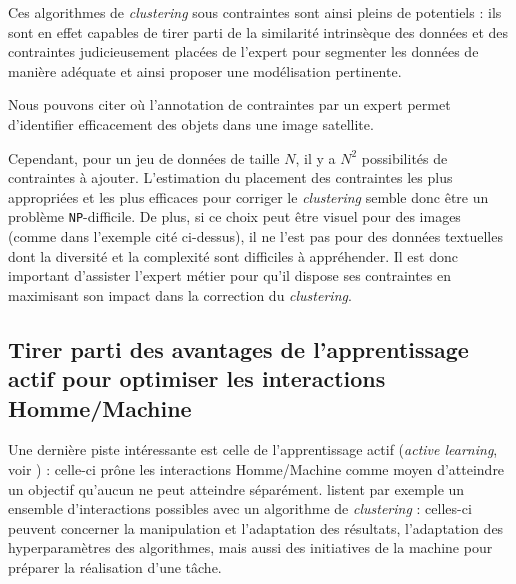 		Ces algorithmes de \textit{clustering} sous contraintes sont ainsi pleins de potentiels : ils sont en effet capables de tirer parti de la similarité intrinsèque des données et des contraintes judicieusement placées de l'expert pour segmenter les données de manière adéquate et ainsi proposer une modélisation pertinente.
		\begin{leftBarExamples}
			Nous pouvons citer \cite{lampert-etal:2019:constrained-distance-based} où l'annotation de contraintes par un expert permet d'identifier efficacement des objets dans une image satellite.
		\end{leftBarExamples}
		
		Cependant, pour un jeu de données de taille $N$, il y a $N^2$ possibilités de contraintes à ajouter.
		L'estimation du placement des contraintes les plus appropriées et les plus efficaces pour corriger le \textit{clustering} semble donc être un problème \texttt{NP}-difficile.
		De plus, si ce choix peut être visuel pour des images (comme dans l'exemple cité ci-dessus), il ne l'est pas pour des données textuelles dont la diversité et la complexité sont difficiles à appréhender.
		Il est donc important d'assister l'expert métier pour qu'il dispose ses contraintes en maximisant son impact dans la correction du \textit{clustering}.
		
	
	\subsection{Tirer parti des avantages de l'apprentissage actif pour optimiser les interactions Homme/Machine}
	\label{section:3.1.3-INTUITIONS-ORIGINES-APPRENTISSAGE-ACTIF}
	
		Une dernière piste intéressante est celle de l'apprentissage actif (\textit{active learning}, voir \cite{settles:2010:active-learning-literature}) : celle-ci prône les interactions Homme/Machine comme moyen d'atteindre un objectif qu'aucun ne peut atteindre séparément.
		\cite{bae-etal:2021:interactive-clustering-comprehensive} listent par exemple un ensemble d'interactions possibles avec un algorithme de \textit{clustering} : celles-ci peuvent concerner la manipulation et l'adaptation des résultats, l'adaptation des hyperparamètres des algorithmes, mais aussi des initiatives de la machine pour préparer la réalisation d'une tâche.
		
